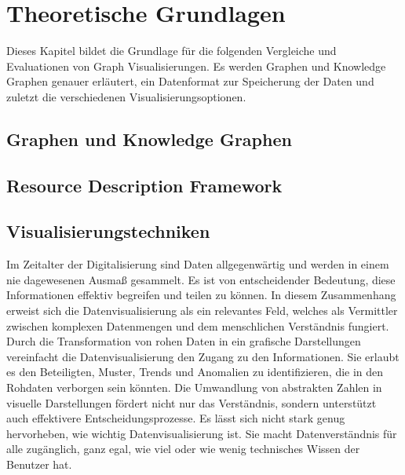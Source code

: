 
\chapter{Theoretische Grundlagen}

Dieses Kapitel bildet die Grundlage für die folgenden Vergleiche und Evaluationen von Graph Visualisierungen. Es werden Graphen und Knowledge Graphen genauer erläutert, ein Datenformat zur Speicherung der Daten und zuletzt die verschiedenen Visualisierungsoptionen. 

\section{Graphen und Knowledge Graphen}

\section{Resource Description Framework}

\section{Visualisierungstechniken}

Im Zeitalter der Digitalisierung sind Daten allgegenwärtig und werden in einem nie dagewesenen Ausmaß gesammelt. Es ist von entscheidender Bedeutung, diese Informationen effektiv begreifen und teilen zu können. In diesem Zusammenhang erweist sich die Datenvisualisierung als ein relevantes Feld, welches als Vermittler zwischen komplexen Datenmengen und dem menschlichen Verständnis fungiert. Durch die Transformation von rohen Daten in ein grafische Darstellungen vereinfacht die Datenvisualisierung den Zugang zu den Informationen. Sie erlaubt es den Beteiligten, Muster, Trends und Anomalien zu identifizieren, die in den Rohdaten verborgen sein könnten. Die Umwandlung von abstrakten Zahlen in visuelle Darstellungen fördert nicht nur das Verständnis, sondern unterstützt auch effektivere Entscheidungsprozesse. Es lässt sich nicht stark genug hervorheben, wie wichtig Datenvisualisierung ist. Sie macht Datenverständnis für alle zugänglich, ganz egal, wie viel oder wie wenig technisches Wissen der Benutzer hat.

